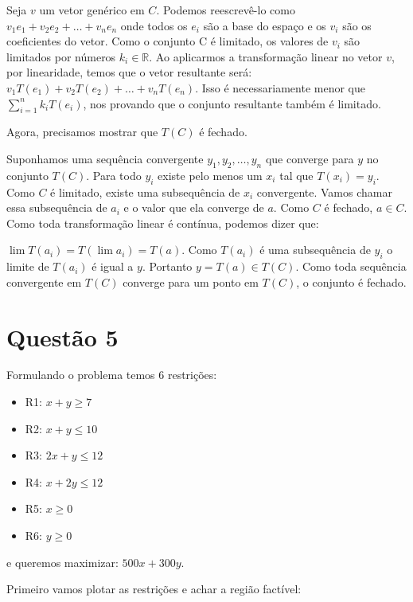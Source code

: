 \documentclass[11pt]{article}
\begin{document}
Seja \(v\) um vetor genérico em \(C\). Podemos reescrevê-lo como \(v_1e_1+v_2e_2+\dots+v_ne_n\) onde todos os \(e_i\) são
a base do espaço e os \(v_i\) são os coeficientes do vetor. Como o conjunto C é limitado, os valores de \(v_i\) são limitados
por números \(k_i \in \mathbb{R}\). Ao aplicarmos a transformação linear no vetor \(v\), por linearidade, temos que o vetor
resultante será: \(v_1T(e_1)+v_2T(e_2)+\dots+v_nT(e_n)\). Isso é necessariamente menor que \(\displaystyle\sum_{i=1}^n k_iT(e_i)\),
nos provando que o conjunto resultante também é limitado.

Agora, precisamos mostrar que \(T(C)\) é fechado.

Suponhamos uma sequência convergente \(y_1,y_2,\dots,y_n\) que converge para \(y\) no conjunto \(T(C)\). Para todo \(y_i\) existe
pelo menos um \(x_i\) tal que \(T(x_i) = y_i\). Como \(C\) é limitado, existe uma subsequência de \(x_i\) convergente.
Vamos chamar essa subsequência de \(a_i\) e o valor que ela converge de \(a\). Como \(C\) é fechado, \(a \in C\).
Como toda transformação linear é contínua, podemos dizer que:

\(\displaystyle\lim T(a_i) = T(\lim a_i) = T(a)\). Como \(T(a_i)\) é uma subsequência de \(y_i\) o limite de \(T(a_i)\) é igual a
\(y\). Portanto \(y = T(a) \in T(C)\). Como toda sequência convergente em \(T(C)\) converge para um ponto em \(T(C)\), o conjunto
é fechado.  
\section{Questão 5}
\label{sec:org7719efd}
Formulando o problema temos 6 restrições:
\begin{itemize}
\item R1: \(x+y \geq 7\)
\item R2: \(x+y \leq 10\)
\item R3: \(2x+y \leq 12\)
\item R4: \(x+2y \leq 12\)
\item R5: \(x \geq 0\)
\item R6: \(y \geq 0\)
\end{itemize}

e queremos maximizar: \(500x+300y\).\newpage

Primeiro vamos plotar as restrições e achar a região factível:
\end{document}

